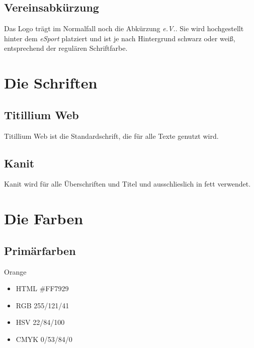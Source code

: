 \documentclass{article}
\begin{document}
\subsection{Vereinsabkürzung}

Das Logo trägt im Normalfall noch die Abkürzung \emph{e.V.}. Sie wird hochgestellt hinter dem \emph{eSport} platziert und ist je nach Hintergrund schwarz oder weiß, entsprechend der regulären Schriftfarbe. %


\cleardoublepage
\section{Die Schriften}

\subsection{Titillium Web}
\begin{samepage}
Titillium Web ist die Standardschrift, die für alle Texte genutzt wird.

\end{samepage}

\subsection{Kanit}
\begin{samepage}
Kanit wird für alle Überschriften und Titel und ausschlieslich in fett verwendet.

\end{samepage}

\cleardoublepage
\section{Die Farben}

\subsection{Primärfarben}
\begin{samepage}
\cfield[LESOrange]
Orange
\begin{itemize}
\item HTML \#FF7929
\item RGB 255/121/41
\item HSV 22/84/100
\item CMYK 0/53/84/0
\end{itemize}
\end{samepage}
\end{document}
